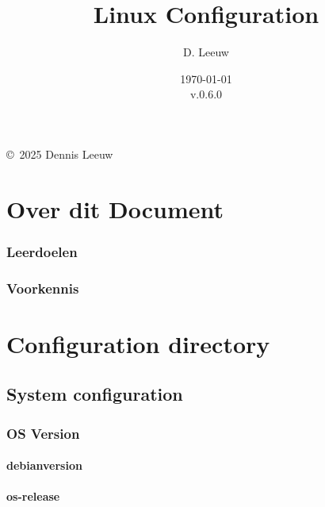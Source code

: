 \documentclass[a4paper,12pt,twoside,openright,titlepage]{book}
\author{D. Leeuw}
\title{Linux Configuration}
\date{\today\\v.0.6.0}
\begin{document}

\maketitle

\copyright\ 2025 Dennis Leeuw\\




\frontmatter
\chapter{Over dit Document}
\subsection{Leerdoelen}

\subsection{Voorkennis}



\tableofcontents

\mainmatter

\chapter{Configuration directory}


\section{System configuration}

\subsection{OS Version}
\subsubsection{debian\textunderscore version}

\subsubsection{os-release}

\end{document}
